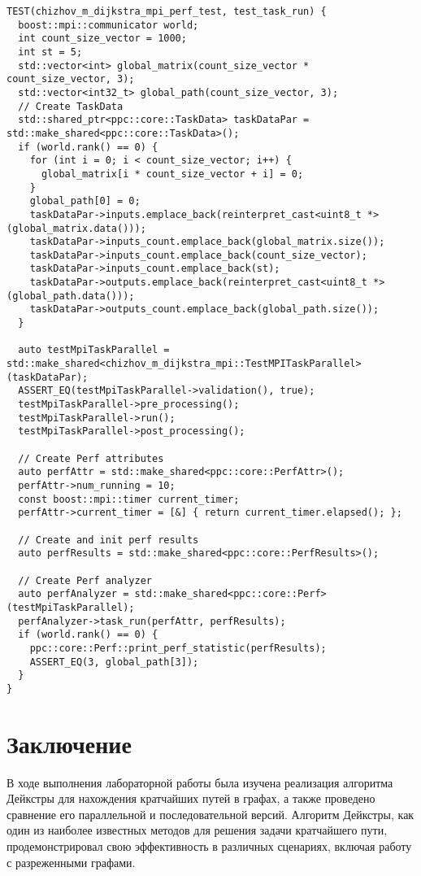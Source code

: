 \documentclass[a4paper, 14pt]{extarticle}
\begin{document}
\begin{lstlisting}
TEST(chizhov_m_dijkstra_mpi_perf_test, test_task_run) {
  boost::mpi::communicator world;
  int count_size_vector = 1000;
  int st = 5;
  std::vector<int> global_matrix(count_size_vector * count_size_vector, 3);
  std::vector<int32_t> global_path(count_size_vector, 3);
  // Create TaskData
  std::shared_ptr<ppc::core::TaskData> taskDataPar = std::make_shared<ppc::core::TaskData>();
  if (world.rank() == 0) {
    for (int i = 0; i < count_size_vector; i++) {
      global_matrix[i * count_size_vector + i] = 0;
    }
    global_path[0] = 0;
    taskDataPar->inputs.emplace_back(reinterpret_cast<uint8_t *>(global_matrix.data()));
    taskDataPar->inputs_count.emplace_back(global_matrix.size());
    taskDataPar->inputs_count.emplace_back(count_size_vector);
    taskDataPar->inputs_count.emplace_back(st);
    taskDataPar->outputs.emplace_back(reinterpret_cast<uint8_t *>(global_path.data()));
    taskDataPar->outputs_count.emplace_back(global_path.size());
  }

  auto testMpiTaskParallel = std::make_shared<chizhov_m_dijkstra_mpi::TestMPITaskParallel>(taskDataPar);
  ASSERT_EQ(testMpiTaskParallel->validation(), true);
  testMpiTaskParallel->pre_processing();
  testMpiTaskParallel->run();
  testMpiTaskParallel->post_processing();

  // Create Perf attributes
  auto perfAttr = std::make_shared<ppc::core::PerfAttr>();
  perfAttr->num_running = 10;
  const boost::mpi::timer current_timer;
  perfAttr->current_timer = [&] { return current_timer.elapsed(); };

  // Create and init perf results
  auto perfResults = std::make_shared<ppc::core::PerfResults>();

  // Create Perf analyzer
  auto perfAnalyzer = std::make_shared<ppc::core::Perf>(testMpiTaskParallel);
  perfAnalyzer->task_run(perfAttr, perfResults);
  if (world.rank() == 0) {
    ppc::core::Perf::print_perf_statistic(perfResults);
    ASSERT_EQ(3, global_path[3]);
  }
}
\end{lstlisting}
\newpage
\section{Заключение}

В ходе выполнения лабораторной работы была изучена реализация алгоритма Дейкстры для нахождения кратчайших путей в графах, а также проведено сравнение его параллельной и последовательной версий. Алгоритм Дейкстры, как один из наиболее известных методов для решения задачи кратчайшего пути, продемонстрировал свою эффективность в различных сценариях, включая работу с разреженными графами.\\
\end{document}
